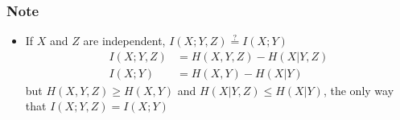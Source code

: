 \documentclass{beamer}
\begin{document}
\begin{frame}
\frametitle{Note}
\begin{itemize}
\item If $X$ and $Z$ are independent, 
	$I(X;Y,Z) \overset{?}{=} I(X;Y)$
\begin{align*}
I(X;Y,Z) &= H(X,Y,Z) - H(X|Y,Z) \\
I(X;Y)   &= H(X,Y)   - H(X|Y)
\end{align*}
but $H(X,Y,Z)\geq H(X,Y)$ and $H(X|Y,Z)\leq H(X|Y)$, the only way
that $I(X;Y,Z)=I(X;Y)$
\end{itemize}

\end{frame}


\end{document}

